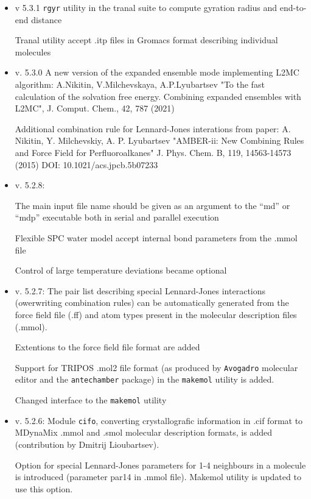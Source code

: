 \documentclass{article}
\begin{document}
\begin{itemize}

\item
v 5.3.1  
\verb|rgyr| utility in the tranal suite to compute gyration radius and end-to-end distance

Tranal utility accept .itp files in Gromacs format describing individual
molecules 
  
\item
v. 5.3.0
A new version of the expanded ensemble mode implementing L2MC algorithm:
A.Nikitin, V.Milchevskaya, A.P.Lyubartsev "To the fast calculation of
the solvation free energy. Combining expanded ensembles with L2MC",
J. Comput. Chem., 42, 787 (2021)

Additional combination rule for Lennard-Jones interations from paper: A. Nikitin, Y. Milchevskiy, A. P. Lyubartsev "AMBER-ii: New Combining Rules and Force Field for Perfluoroalkanes" J. Phys. Chem. B, 119, 14563-14573 (2015) DOI: 10.1021/acs.jpcb.5b07233


\item
v. 5.2.8:

The main input file name should be given as an argument to the 
``md'' or ``mdp'' executable both in serial and parallel execution

Flexible SPC water model accept internal bond parameters from the .mmol file

Control of large temperature deviations became optional

\item
v. 5.2.7:
The pair list describing special Lennard-Jones interactions (owerwriting 
combination rules) can be automatically generated from the force field file
(.ff) and atom types present in the molecular description files (.mmol).

Extentions to the force field file format are added

Support for TRIPOS .mol2 file format (as produced by 
\verb|Avogadro| molecular editor and the \verb|antechamber| package) in 
the \verb|makemol| utility is added. 

Changed interface to the \verb|makemol| utility  

\item
v. 5.2.6:
Module \verb|cifo|, converting crystallografic information in .cif format to MDynaMix
.mmol and .smol molecular description formats, is added (contribution by Dmitrij Lioubartsev).

Option for special Lennard-Jones parameters for 1-4 neighbours
in a molecule is introduced (parameter par14 in .mmol file).
Makemol utility is updated to use this option.


\end{itemize}
\end{document}

